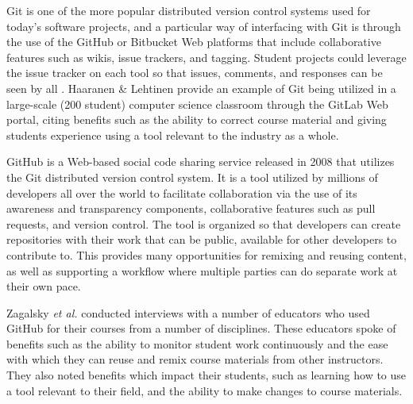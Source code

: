 Git is one of the more popular distributed version control systems used for today's software projects, and a particular way of interfacing with Git is through the use of the GitHub or Bitbucket Web platforms that include collaborative features such as wikis, issue trackers, and tagging. Student projects could leverage the issue tracker on each tool so that issues, comments, and responses can be seen by all \cite{kelleher2014employing}. Haaranen \& Lehtinen \cite{haaranen2015teaching} provide an example of Git being utilized in a large-scale (200 student) computer science classroom through the GitLab Web portal, citing benefits such as the ability to correct course material and giving students experience using a tool relevant to the industry as a whole.

GitHub is a Web-based social code sharing service released in 2008 that utilizes the Git distributed version control system. It is a tool utilized by millions of developers all over the world to facilitate collaboration via the use of its awareness and transparency components, collaborative features such as pull requests, and version control. The tool is organized so that developers can create repositories with their work that can be public, available for other developers to contribute to. This provides many opportunities for remixing and reusing content, as well as supporting a workflow where multiple parties can do separate work at their own pace.

Zagalsky \emph{et al.} \cite{zagalsky} conducted interviews with a number of educators who used GitHub for their courses from a number of disciplines. These educators spoke of benefits such as the ability to monitor student work continuously and the ease with which they can reuse and remix course materials from other instructors. They also noted benefits which impact their students, such as learning how to use a tool relevant to their field, and the ability to make changes to course materials.
